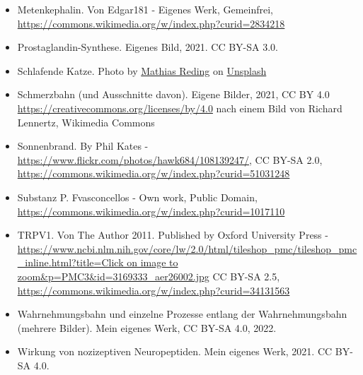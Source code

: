 \documentclass{beamer}
\begin{document}
\begin{frame}
\begin{tiny}
\begin{itemize}
\item
Metenkephalin. Von Edgar181 - Eigenes Werk, Gemeinfrei, \url{https://commons.wikimedia.org/w/index.php?curid=2834218}

\item
Prostaglandin-Synthese. Eigenes Bild, 2021. CC BY-SA 3.0.

\item
Schlafende Katze. Photo by \href{https://unsplash.com/@matreding?utm_source=unsplash&utm_medium=referral&utm_content=creditCopyText}{Mathias Reding} on \href{https://unsplash.com/s/photos/sleep?utm_source=unsplash&utm_medium=referral&utm_content=creditCopyText}{Unsplash}
  

\item
Schmerzbahn (und Ausschnitte davon). Eigene Bilder, 2021, CC BY 4.0 \url{https://creativecommons.org/licenses/by/4.0} nach einem Bild von Richard Lennertz,  Wikimedia Commons

\item
Sonnenbrand. By Phil Kates - \url{https://www.flickr.com/photos/hawk684/108139247/}, CC BY-SA 2.0, \url{https://commons.wikimedia.org/w/index.php?curid=51031248}

\item
Substanz P. Fvasconcellos - Own work, Public Domain, \url{https://commons.wikimedia.org/w/index.php?curid=1017110}

\item
TRPV1. Von The Author 2011. Published by Oxford University Press - \url{https://www.ncbi.nlm.nih.gov/core/lw/2.0/html/tileshop_pmc/tileshop_pmc_inline.html?title=Click on image to zoom&p=PMC3&id=3169333_aer26002.jpg}
CC BY-SA 2.5, \url{https://commons.wikimedia.org/w/index.php?curid=34131563}

\item
Wahrnehmungsbahn und einzelne Prozesse entlang der Wahrnehmungsbahn (mehrere Bilder). Mein eigenes Werk, CC BY-SA 4.0, 2022. 

\item
Wirkung von nozizeptiven Neuropeptiden. Mein eigenes Werk, 2021. CC BY-SA 4.0. 

\end{itemize}
\end{tiny}

\end{frame}




\end{document}
